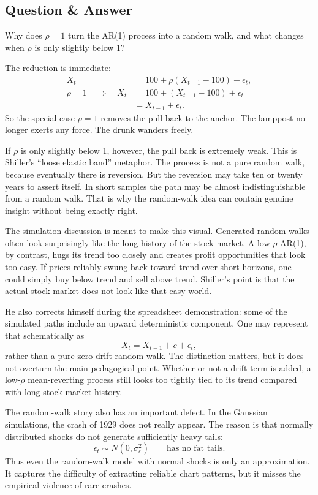 \subsection{Question \& Answer}

Why does \(\rho=1\) turn the AR(1) process into a random walk, and what changes when \(\rho\) is only slightly below 1?

The reduction is immediate:
\begin{align}
X_t &= 100 + \rho(X_{t-1}-100) + \epsilon_t, \\
\rho=1 \quad \Longrightarrow \quad
X_t &= 100 + (X_{t-1}-100) + \epsilon_t \\
&= X_{t-1} + \epsilon_t.
\end{align}
So the special case \(\rho=1\) removes the pull back to the anchor. The lamppost no longer exerts any force. The drunk wanders freely.

If \(\rho\) is only slightly below 1, however, the pull back is extremely weak. This is Shiller's ``loose elastic band'' metaphor. The process is not a pure random walk, because eventually there is reversion. But the reversion may take ten or twenty years to assert itself. In short samples the path may be almost indistinguishable from a random walk. That is why the random-walk idea can contain genuine insight without being exactly right.

The simulation discussion is meant to make this visual. Generated random walks often look surprisingly like the long history of the stock market. A low-\(\rho\) AR(1), by contrast, hugs its trend too closely and creates profit opportunities that look too easy. If prices reliably swung back toward trend over short horizons, one could simply buy below trend and sell above trend. Shiller's point is that the actual stock market does not look like that easy world.

He also corrects himself during the spreadsheet demonstration: some of the simulated paths include an upward deterministic component. One may represent that schematically as
\begin{equation}
X_t = X_{t-1} + c + \epsilon_t,
\end{equation}
rather than a pure zero-drift random walk. The distinction matters, but it does not overturn the main pedagogical point. Whether or not a drift term is added, a low-\(\rho\) mean-reverting process still looks too tightly tied to its trend compared with long stock-market history.

The random-walk story also has an important defect. In the Gaussian simulations, the crash of 1929 does not really appear. The reason is that normally distributed shocks do not generate sufficiently heavy tails:
\begin{equation}
\epsilon_t \sim N(0,\sigma_\epsilon^2)
\qquad \text{has no fat tails.}
\end{equation}
Thus even the random-walk model with normal shocks is only an approximation. It captures the difficulty of extracting reliable chart patterns, but it misses the empirical violence of rare crashes.

